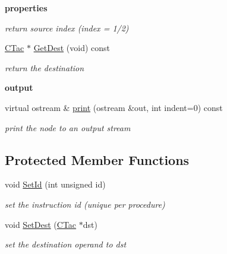 \begin{Indent}{\bf properties}
\begin{DoxyCompactItemize}
\begin{DoxyCompactList}\small\item\em return source {\itshape index} (index = 1/2) \end{DoxyCompactList}\item 
\hypertarget{classCTacInstr_af53de7997cd9e26d91b91a0e8f17c3b1}{\hyperlink{classCTac}{C\-Tac} $\ast$ \hyperlink{classCTacInstr_af53de7997cd9e26d91b91a0e8f17c3b1}{Get\-Dest} (void) const }\label{classCTacInstr_af53de7997cd9e26d91b91a0e8f17c3b1}

\begin{DoxyCompactList}\small\item\em return the destination \end{DoxyCompactList}\end{DoxyCompactItemize}
\end{Indent}
\begin{Indent}{\bf output}\par
\begin{DoxyCompactItemize}
\item 
virtual ostream \& \hyperlink{classCTacInstr_ac210f2f3e62b772d4e93689ca5449834}{print} (ostream \&out, int indent=0) const 
\begin{DoxyCompactList}\small\item\em print the node to an output stream \end{DoxyCompactList}\end{DoxyCompactItemize}
\end{Indent}
\subsection*{Protected Member Functions}
\begin{DoxyCompactItemize}
\item 
\hypertarget{classCTacInstr_a08b26825cb81665d8278caf854c6c52e}{void \hyperlink{classCTacInstr_a08b26825cb81665d8278caf854c6c52e}{Set\-Id} (int unsigned id)}\label{classCTacInstr_a08b26825cb81665d8278caf854c6c52e}

\begin{DoxyCompactList}\small\item\em set the instruction {\itshape id} (unique per procedure) \end{DoxyCompactList}\item 
\hypertarget{classCTacInstr_ab7801258876bc4b8e8349ba8afddb9a0}{void \hyperlink{classCTacInstr_ab7801258876bc4b8e8349ba8afddb9a0}{Set\-Dest} (\hyperlink{classCTac}{C\-Tac} $\ast$dst)}\label{classCTacInstr_ab7801258876bc4b8e8349ba8afddb9a0}

\begin{DoxyCompactList}\small\item\em set the destination operand to {\itshape dst} \end{DoxyCompactList}\end{DoxyCompactItemize}
